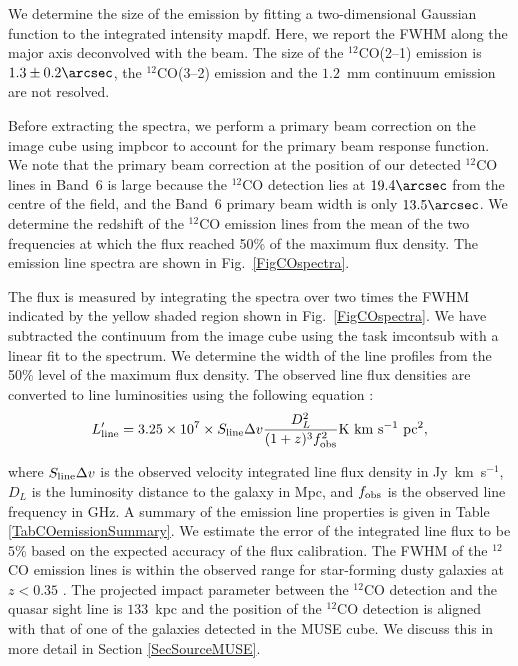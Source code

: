 \documentclass[a4paper,fleqn,usenatbib]{mnras}
\begin{document}
We determine the size of the emission by fitting a two-dimensional Gaussian function to the integrated intensity mapdf. Here, we report the FWHM along the major axis deconvolved with the beam. The size of the $^{12}$CO(2--1) emission is $1.3 \pm 0.2\arcsec$, the $^{12}$CO(3--2) emission and the $1.2$~mm continuum emission are not resolved.

Before extracting the spectra, we perform a primary beam correction on the image cube using {\sc impbcor}  to account for the primary beam response function. We note that the primary beam correction at the position of our detected $^{12}$CO lines in Band~6 is large because the $^{12}$CO detection lies at $19.4\arcsec$ from the centre of the field, and the Band~6 primary beam width is only $13.5\arcsec$. We determine the redshift of the $^{12}$CO emission lines from the mean of the two frequencies at which the flux reached 50\% of the maximum flux density. 
The emission line spectra are shown in \mbox{Fig.~\ref{FigCOspectra}}.

The flux is measured by integrating the spectra over two times the FWHM indicated by the yellow shaded region shown in Fig.\ \ref{FigCOspectra}. We have subtracted the continuum from the image cube using the task {\sc imcontsub} with a linear fit to the spectrum. We determine the width of the line profiles from the 50\% level of the maximum flux density. The observed line flux densities are converted to line luminosities using the following equation \mbox{\citep{Solomon1992warm}}:
\begin{equation}
L'_{\rm line} = 3.25 \times 10^7 \times S_{\rm line} \Delta v \frac{D_L^2}{(1+z)^3 f_{\rm obs}^2} \rm{K~km~s^{-1}~pc^{2}},
\end{equation}

where $S_{\rm line} \Delta v $ is the observed velocity integrated line flux density in \mbox{Jy km s$^{-1}$}, $D_L$ is the luminosity distance to the galaxy in Mpc, and $f_{\rm obs}$ is the observed line frequency in GHz. A summary of the emission line properties is given in Table \ref{TabCOemissionSummary}. We estimate the error of the integrated line flux to be $5$\% based on the expected accuracy of the flux calibration. The FWHM of the $^{12}$CO emission lines is within the observed range for star-forming dusty galaxies at $z < 0.35$ \citep{Villanueva2017vales}. The projected impact parameter between the $^{12}$CO detection and the quasar sight line is $133$~kpc and the position of the $^{12}$CO detection is aligned with that of one of the galaxies detected in the MUSE cube. We discuss this in more detail in Section \ref{SecSourceMUSE}.
\end{document}
